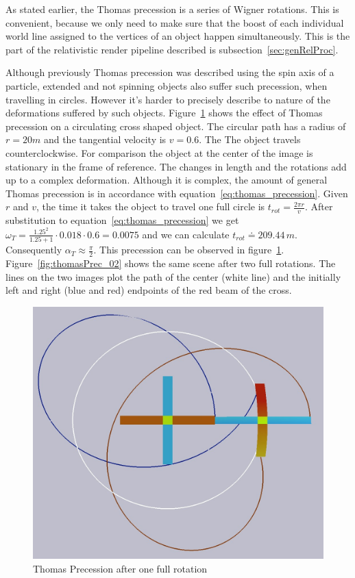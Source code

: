 \documentclass{egpubl}
\begin{document}
As stated earlier, the Thomas precession is a series of Wigner rotations. This is convenient, because we only need to make sure that the boost of each individual world line assigned to the vertices of an object happen simultaneously. This is the part of the relativistic render pipeline described is subsection~\ref{sec:genRelProc}.

Although previously Thomas precession was described using the spin axis of a particle, extended and not spinning objects also suffer such precession, when travelling in circles. However it's harder to precisely describe to nature of the deformations suffered by such objects. Figure~\ref{fig:thomasPrec_01} shows the effect of Thomas precession on a circulating cross shaped object. The circular path has a radius of $r=20m$ and the tangential velocity is $v=0.6$. The The object travels counterclockwise. For comparison the object at the center of the image is stationary in the frame of reference. The changes in length and the rotations add up to a complex deformation. Although it is complex, the amount of general Thomas precession is in accordance with equation~\ref{eq:thomas_precession}. Given $r$ and $v$, the time it takes the object to travel one full circle is $t_{rot}=\frac{2\pi{}r}{v}$. After substitution to equation~\ref{eq:thomas_precession} we get $\omega_T=\frac{1.25^2}{1.25+1}\cdot{}0.018\cdot{}0.6=0.0075$ and we can calculate $t_{rot} \doteq 209.44\,{}m$. Consequently $\alpha{}_T \approx \frac{\pi}{2}$. This precession can be observed in figure~\ref{fig:thomasPrec_01}. Figure~\ref{fig:thomasPrec_02} shows the same scene after two full rotations. The lines on the two images plot the path of the center (white line) and the initially left and right (blue and red) endpoints of the red beam of the cross.
\begin{figure}[htb]
  	\centering
	\includegraphics[width=.95\linewidth]{figures/v06_r20_1rot_path.jpg}
	\caption{Thomas Precession after one full rotation}
	\label{fig:thomasPrec_01}
\end{figure}
\end{document}
